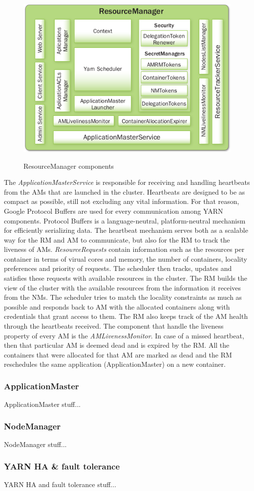 \begin{figure}
\centering
\includegraphics[scale=0.5]{resources/images/Background/RM_components.png}
\label{fig:yarn_RM_components}
\caption{ResourceManager components}
\end{figure}

The \emph{ApplicationMasterService} is responsible for receiving and
handling heartbeats from the AMs that are launched in the
cluster. Heartbeats are designed to be as compact as possible, still
not excluding any vital information. For that reason, Google Protocol
Buffers \cite{proto_buf} are used for every communication among YARN
components. Protocol Buffers is a language-neutral, platform-neutral
mechanism for efficiently serializing data. The heartbeat mechanism
serves both as a scalable way for the RM and AM to communicate, but
also for the RM to track the liveness of AMs. \emph{ResourceRequests}
contain information such as the resources per container in terms of
virual cores and memory, the number of containers, locality
preferences and priority of requests. The scheduler then tracks,
updates and satisfies these requests with available resources in the
cluster. The RM builds the view of the cluster with the available
resources from the information it receives from the NMs. The scheduler
tries to match the locality constraints as much as possible and
responds back to AM with the allocated containers along with
credentials that grant access to them. The RM also keeps track of the
AM health through the heartbeats received. The component that handle
the liveness property of every AM is the \emph{AMLivenessMonitor}. In
case of a missed heartbeat, then that particular AM is deemed dead and
is expired by the RM. All the containers that were allocated for
that AM are marked as dead and the RM reschedules the same application
(ApplicationMaster) on a new container.

\subsubsection{ApplicationMaster}
\label{sssec:am}
ApplicationMaster stuff...

\subsubsection{NodeManager}
\label{sssec:nm}
NodeManager stuff...

\subsubsection{YARN HA \& fault tolerance}
\label{sssec:yarn_ha}
YARN HA and fault tolerance stuff...
